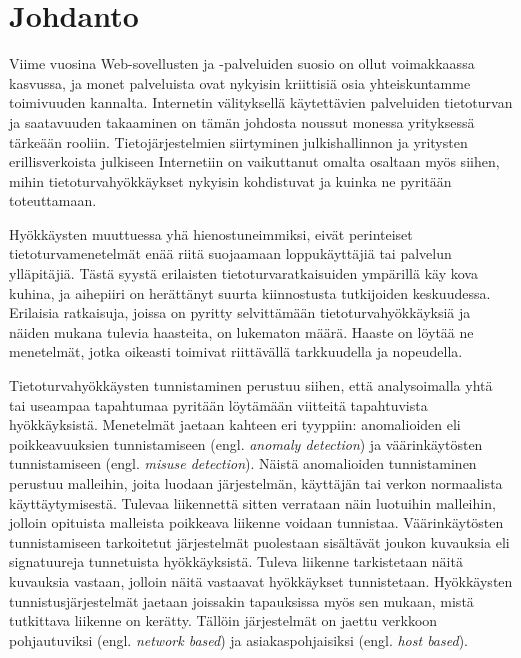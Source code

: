 
\chapter{Johdanto}

Viime vuosina Web-sovellusten ja -palveluiden suosio on 
ollut voimakkaassa kasvussa, ja monet palveluista ovat nykyisin kriittisiä osia
yhteiskuntamme toimivuuden kannalta. Internetin välityksellä
käytettävien palveluiden tietoturvan ja saatavuuden takaaminen on
tämän johdosta noussut monessa yrityksessä tärkeään rooliin.
Tietojärjestelmien siirtyminen julkishallinnon ja
yritysten erillisverkoista julkiseen Internetiin on vaikuttanut omalta
osaltaan myös siihen, mihin tietoturvahyökkäykset nykyisin
kohdistuvat ja kuinka ne pyritään toteuttamaan.

Hyökkäysten muuttuessa yhä hienostuneimmiksi, eivät perinteiset
tietoturvamenetelmät enää riitä suojaamaan loppukäyttäjiä tai palvelun
ylläpitäjiä. Tästä syystä erilaisten tietoturvaratkaisuiden ympärillä
käy kova kuhina, ja aihepiiri on herättänyt suurta kiinnostusta
tutkijoiden keskuudessa. Erilaisia ratkaisuja, joissa on pyritty
selvittämään tietoturvahyökkäyksiä ja näiden mukana tulevia haasteita,
on lukematon määrä. Haaste on löytää ne menetelmät, jotka oikeasti
toimivat riittävällä tarkkuudella ja nopeudella.

Tietoturvahyökkäysten tunnistaminen perustuu siihen, että
analysoimalla yhtä tai useampaa tapahtumaa pyritään löytämään
viitteitä tapahtuvista hyökkäyksistä. Menetelmät jaetaan kahteen eri
tyyppiin: anomalioiden eli poikkeavuuksien tunnistamiseen
(engl. \textit{anomaly detection}) ja väärinkäytösten tunnistamiseen
(engl. \textit{misuse detection}). Näistä anomalioiden tunnistaminen
perustuu malleihin, joita luodaan järjestelmän, käyttäjän tai verkon
normaalista käyttäytymisestä. Tulevaa liikennettä sitten verrataan 
näin luotuihin malleihin, jolloin opituista malleista poikkeava liikenne
voidaan tunnistaa. Väärinkäytösten tunnistamiseen tarkoitetut järjestelmät 
puolestaan sisältävät joukon kuvauksia eli signatuureja tunnetuista hyökkäyksistä. 
Tuleva liikenne tarkistetaan näitä kuvauksia vastaan, jolloin näitä vastaavat
hyökkäykset tunnistetaan. Hyökkäysten tunnistusjärjestelmät
jaetaan joissakin tapauksissa myös sen mukaan, mistä tutkittava
liikenne on kerätty. Tällöin järjestelmät on jaettu verkkoon
pohjautuviksi (engl. \textit{network based}) ja asiakaspohjaisiksi
(engl. \textit{host based}).

